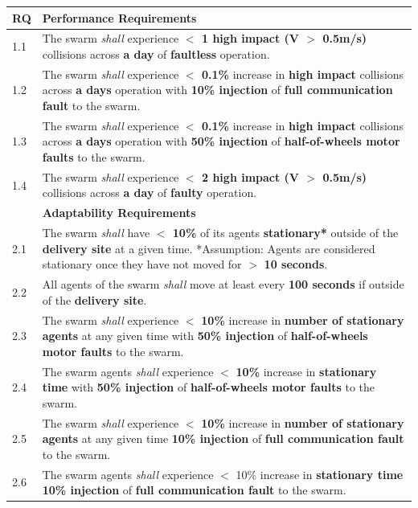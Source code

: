 \documentclass[runningheads]{llncs}
\begin{document}
\tiny
\begin{table}[!t]
\centering
\begin{tabular}{p{5mm} p{116mm} }
	RQ & \textbf{Performance Requirements}\\
	\hline
	1.1 & The swarm \emph{shall} experience \textbf{$<$ 1 high impact (V $>$ 0.5m/s)} collisions across \textbf{a day} of \textbf{faultless} operation. \\ 
	\hline
	1.2 & The swarm \emph{shall} experience \textbf{$<$ 0.1\%} increase in \textbf{high impact} collisions across \textbf{a days} operation with \textbf{10\% injection} of \textbf{full communication fault} to the swarm.\\ 
	\hline
	1.3 & The swarm \emph{shall} experience \textbf{$<$ 0.1\%} increase in \textbf{high impact} collisions across \textbf{a days} operation with \textbf{50\% injection} of \textbf{half-of-wheels motor faults} to the swarm.	\\	
	\hline
	1.4 & The swarm \emph{shall} experience \textbf{$<$ 2 high impact (V $>$ 0.5m/s)} collisions across \textbf{a day} of \textbf{faulty} operation.  \\		[1ex] 		
	\hline
	& \textbf{Adaptability Requirements}\\
	\hline
	2.1 & The swarm \emph{shall} have \textbf{$<$ 10\%} of its agents \textbf{stationary*} outside of the \textbf{delivery site} at a given time.
	*Assumption: Agents are considered stationary once they have not moved for $>$ \textbf{10 seconds}.
	\\ 
	\hline
	2.2 & All agents of the swarm \emph{shall} move at least every \textbf{100 seconds} if outside of the \textbf{delivery site}. \\ 
	\hline
	2.3 & The swarm \emph{shall} experience $<$ \textbf{10\%} increase in \textbf{number of stationary agents} at any given time with \textbf{50\% injection} of \textbf{half-of-wheels motor faults} to the swarm. \\
	\hline
	2.4 & The swarm agents \emph{shall} experience $<$ \textbf{10\%} increase in \textbf{stationary time} with \textbf{50\% injection} of \textbf{half-of-wheels motor faults} to the swarm.\\ 
	\hline
	2.5 & The swarm \emph{shall} experience $<$ \textbf{10\%} increase in \textbf{number of stationary agents} at any given time \textbf{10\% injection} of \textbf{full communication fault} to the swarm.\\
	\hline
	2.6 & The swarm agents \emph{shall} experience $<$ 10\% increase in \textbf{stationary time 10\% injection} of \textbf{full communication fault} to the swarm. \\	

\end{tabular}
\end{table}
\end{document}
